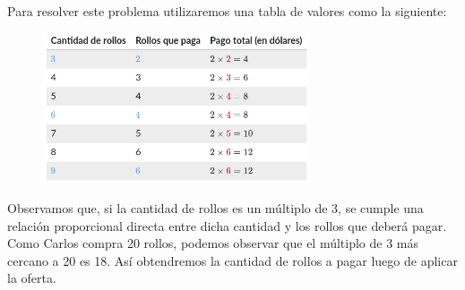 \documentclass[11pt]{book}
\begin{document}
Para resolver este problema utilizaremos una tabla de valores como la siguiente:




\begin{figure}[H]
  \centering
  \includegraphics[width=0.7\textwidth]{./Unidad 2/Images/tableS8L102.png}
\end{figure}

Observamos que, si la cantidad de rollos es un múltiplo de 3, se cumple una relación proporcional directa entre dicha cantidad y los rollos que deberá pagar.\\

Como Carlos compra 20 rollos, podemos observar que el múltiplo de 3 más cercano a 20 es 18. Así obtendremos la cantidad de rollos a pagar luego de aplicar la oferta.\\
\end{document}
